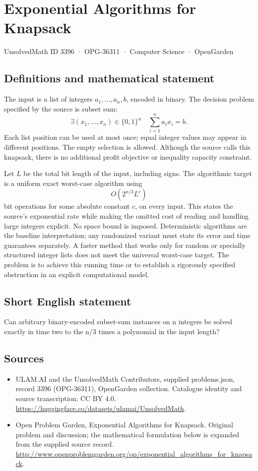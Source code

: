 \documentclass[11pt,a4paper]{article}
\begin{document}
\section*{Exponential Algorithms for Knapsack}\label{3396}
{\small UnsolvedMath ID 3396 · OPG-36311 · Computer Science · OpenGarden}
\subsection{Definitions and mathematical statement}
The input is a list of integers $a_1,\ldots,a_n,b$, encoded in binary.
The decision problem specified by the source is subset sum:
\[
 \exists (x_1,\ldots,x_n)\in\{0,1\}^n\quad
                        \sum_{i=1}^n a_ix_i=b.
\]
Each list position can be used at most once; equal integer values
may appear in different positions. The empty selection is allowed.
Although the source calls this knapsack, there is no additional
profit objective or inequality capacity constraint.

Let $L$ be the total bit length of the input, including signs. The
algorithmic target is a uniform exact worst-case algorithm using
\[
                            O(2^{n/3}L^c)
\]
bit operations for some absolute constant $c$, on every input.
This states the source's exponential rate while making the omitted
cost of reading and handling large integers explicit. No space bound
is imposed. Deterministic algorithms are the baseline interpretation;
any randomized variant must state its error and time guarantees
separately. A faster method that works only for random or specially
structured integer lists does not meet the universal worst-case
target. The problem is to achieve this running time or to establish
a rigorously specified obstruction in an explicit computational model.
\subsection{Short English statement}
Can arbitrary binary-encoded subset-sum instances on n integers be solved exactly in time two to the n/3 times a polynomial in the input length?
\subsection{Sources}
\begin{itemize}
\item[S1] ULAM.AI and the UnsolvedMath Contributors, supplied problems.json, record 3396 (OPG-36311), OpenGarden collection. Catalogue identity and source transcription; CC BY 4.0.
\url{https://huggingface.co/datasets/ulamai/UnsolvedMath}.
\item[S2] Open Problem Garden, Exponential Algorithms for Knapsack. Original problem and discussion; the mathematical formulation below is expanded from the supplied source record.
\url{http://www.openproblemgarden.org/op/exponential_algorithms_for_knapsack}.
\end{itemize}
\end{document}
